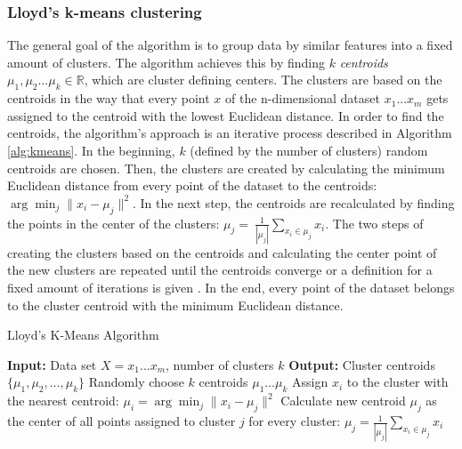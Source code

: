 \subsubsection{Lloyd's k-means clustering}
The general goal of the algorithm is to group data by similar features into a fixed amount of clusters. The algorithm achieves this by finding $k$ \emph{centroids} $\mu_1, \mu_2 ... \mu_k \in \mathbb{R}$, which are cluster defining centers. The clusters are based on the centroids in the way that every point $x$ of the n-dimensional dataset ${x_1 ... x_m}$ gets assigned to the centroid with the lowest Euclidean distance. In order to find the centroids, the algorithm's approach is an iterative process described in Algorithm \ref{alg:kmeans}. In the beginning, $k$ (defined by the number of clusters) random centroids are chosen. Then, the clusters are created by calculating the minimum Euclidean distance from every point of the dataset to the centroids: $\arg\min_j \|x_i - \mu_j\|^2$. In the next step, the centroids are recalculated by finding the points in the center of the clusters: $\mu_j = \ \frac {1}{|\mu_j|} \sum_{x_i \in \mu_j} x_i$. The two steps of creating the clusters based on the centroids and calculating the center point of the new clusters are repeated until the centroids converge or a definition for a fixed amount of iterations is given \cite{piech2013kmeans} \cite{lloyd1982kmeans}. In the end, every point of the dataset belongs to the cluster centroid with the minimum Euclidean distance.


\begin{algorithm}
	\caption{Lloyd's K-Means Algorithm}
	\label{alg:kmeans}
	\begin{algorithmic}
		\State \textbf{Input:} Data set $X = {x_1 \ldots x_m}$, number of clusters $k$
		\State \textbf{Output:} Cluster centroids $\{\mu_1, \mu_2, \ldots, \mu_k\}$
		\State Randomly choose $k$ centroids ${\mu_1 \ldots \mu_k}$ 
		\Repeat
			\State Assign $x_i$ to the cluster with the nearest centroid: $\mu_i = \arg\min_j \|x_i - \mu_j\|^2$
		\EndFor
			\State Calculate new centroid $\mu_j$ as the center of all points assigned to cluster $j$ for every cluster: $\mu_j = \frac{1}{|\mu_j|} \sum_{x_i \in \mu_j} x_i$
		\EndFor
	\end{algorithmic}
\end{algorithm}

